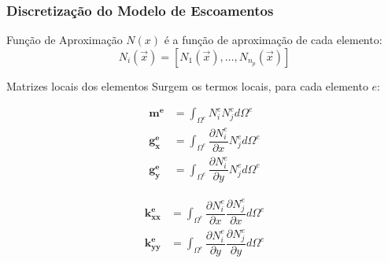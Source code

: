 \documentclass{beamer}
\begin{document}
\begin{frame}
  \frametitle{Discretização do Modelo de Escoamentos}
  
  \begin{block}{Função de Aproximação}
    $N(x)$ é a função de aproximação de cada elemento:
    \begin{equation*}
      N_{i}(\vec{x}) = [N_{1}(\vec{x}), \ldots, N_{n_p}(\vec{x})]
    \end{equation*}
  \end{block}
  
  \begin{block}{Matrizes locais dos elementos}
    Surgem os termos locais, para cada elemento $e$:
    \begin{minipage}{.45\textwidth}
      \vspace*{-\baselineskip}\setlength\belowdisplayshortskip{0pt} %
      \vspace{5pt}
      \begin{align*}
	\mathbf{m^e} &=
	\int_{\Omega^e}
	N_i^e N_j^e
	d\Omega^e \\
	\mathbf{g_x^e} &=
	\int_{\Omega^e}
	\dfrac{\partial N_i^e}{\partial x}
	N_j^e
	d\Omega^e \\
	\mathbf{g_y^e} &=
	\int_{\Omega^e}
	\dfrac{\partial N_i^e}{\partial y}
	N_j^e
	d\Omega^e
      \end{align*}
    \end{minipage}
    \hfill
    \begin{minipage}{.45\textwidth}
      \vspace*{-\baselineskip}\setlength\belowdisplayshortskip{0pt} %
      \begin{align*}
	\mathbf{k_{xx}^e} &=
	\int_{\Omega^e}
	\dfrac{\partial N_i^e}{\partial x}
	\dfrac{\partial N_j^e}{\partial x}
	d\Omega^e \\
	\mathbf{k_{yy}^e} &=
	\int_{\Omega^e}
	\dfrac{\partial N_i^e}{\partial y}
	\dfrac{\partial N_j^e}{\partial y}
	d\Omega^e
      \end{align*}
    \end{minipage}
  \end{block}
\end{frame}
  
\end{document}
